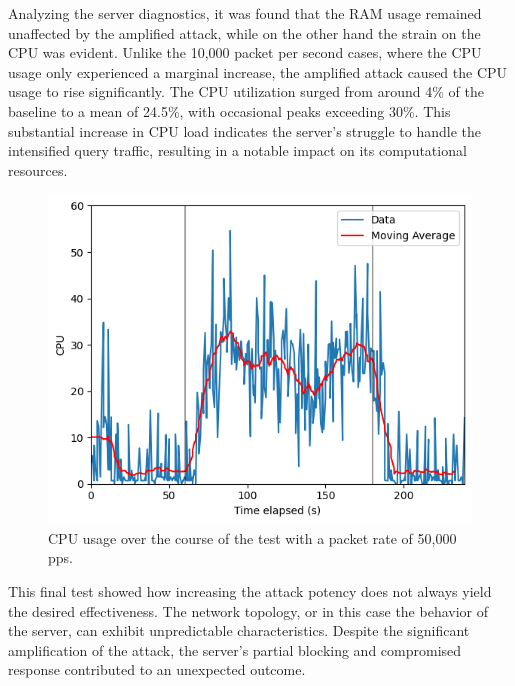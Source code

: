 \noindent Analyzing the server diagnostics, it was found that the RAM usage remained unaffected by the amplified attack, while on the other hand the strain on the CPU was evident. Unlike the 10,000 packet per second cases, where the CPU usage only experienced a marginal increase, the amplified attack caused the CPU usage to rise significantly. The CPU utilization surged from around 4\% of the baseline to a mean of 24.5\%, with occasional peaks exceeding 30\%. This substantial increase in CPU load indicates the server's struggle to handle the intensified query traffic, resulting in a notable impact on its computational resources.\\
\begin{figure}[H]
    \centering
    \includegraphics[width=\columnwidth]{Sections/Images/Server_CPU_ANY50.png}
    \caption{CPU usage over the course of the test with a packet rate of 50,000 pps.}
    \label{fig:Server_CPU_ANY50}
\end{figure}
\noindent This final test showed how increasing the attack potency does not always yield the desired effectiveness. The network topology, or in this case the behavior of the server, can exhibit unpredictable characteristics. Despite the significant amplification of the attack, the server's partial blocking and compromised response contributed to an unexpected outcome.\\
\\